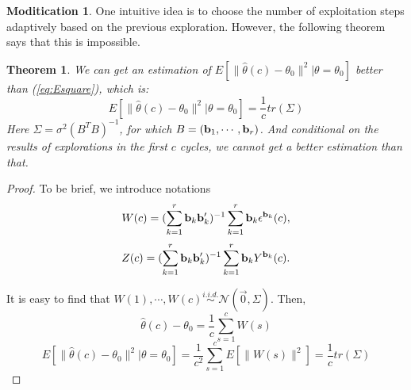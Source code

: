 \documentclass{article}
\newtheorem{theorem}{Theorem}
\theoremstyle{plain}
\theoremstyle{definition}
\newtheorem{modification}{Moditication}
\begin{document}
\begin{modification}
One intuitive idea is to choose the number of exploitation steps adaptively based on the previous exploration. However, the following theorem says that this is impossible.  
\begin{theorem}
We can get an estimation of $E[\|\hat{\theta}(c)-\theta_0\|^2|\theta=\theta_0]$ better than (\ref{eq:Esquare}), which is:
\begin{equation}\label{eq:betterEsquare}
E[\|\hat{\theta}(c)-\theta_0\|^2|\theta=\theta_0]=\frac{1}{c}tr(\Sigma)
\end{equation}
Here 
$\Sigma=\sigma^2(B^TB)^{-1}$, for which $B=(\bold{b}_1,\cdots,\bold{b}_r)$. And conditional on the results of explorations in the first $c$ cycles, we cannot get a better estimation than that.
\end{theorem}

\begin{proof}
To be brief, we introduce notations
 \[W(c)=(\sum_{k=1}^{r}\bold{b}_k\bold{b}_k')^{-1}\sum_{k=1}^{r}\bold{b}_{k}\epsilon^{\bold{b}_k}(c),\] 
 \[Z(c) =(\sum_{k=1}^{r}\bold{b}_k\bold{b}_k')^{-1}\sum_{k=1}^{r}\bold{b}_{k}Y^{\bold{b}_k}(c).\] 

It is easy to find that $W(1),\cdots, W(c)\stackrel{i.i.d.}{\sim}\mathcal{N}(\vec{0},\Sigma)$.  Then, 
\[\hat{\theta}(c)-\theta_0=\frac{1}{c}\sum_{s=1}^{c}W(s)\]
\[
E\left[\|\hat{\theta}(c)-\theta_0\|^2|\theta=\theta_0\right]
=\frac{1}{c^2}\sum_{s=1}^{c}E[\|W(s)\|^2]=\frac{1}{c}tr(\Sigma)
\]


\end{proof}
\end{modification}
\end{document}
